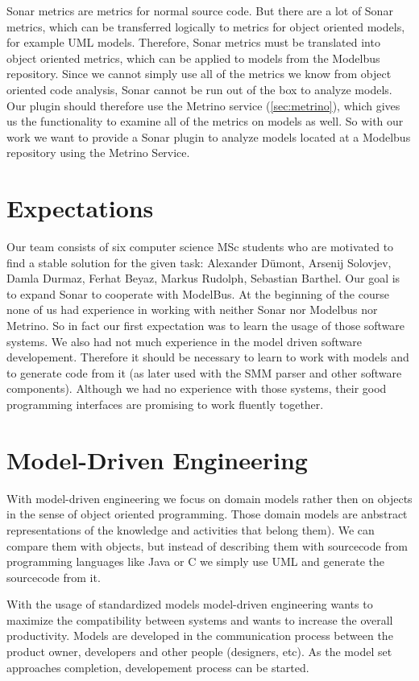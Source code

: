 Sonar metrics are metrics for normal source code. But there are a lot of Sonar metrics, which can be transferred logically to metrics for object oriented models, for example UML models. Therefore, Sonar metrics must be translated into object oriented metrics, which can be applied to models from the Modelbus repository. Since we cannot simply use all of the metrics we know from object oriented code analysis, Sonar cannot be run out of the box to analyze models. Our plugin should therefore use the Metrino service (\autoref{sec:metrino}), which gives us the functionality to examine all of the metrics on models as well. So with our work we want to provide a Sonar plugin to analyze models located at a Modelbus repository using the Metrino Service.

\section{Expectations}
Our team consists of six computer science MSc students who are motivated to find a stable solution for the given task: Alexander Dümont, Arsenij Solovjev, Damla Durmaz, Ferhat Beyaz, Markus Rudolph, Sebastian Barthel.
Our goal is to expand Sonar to cooperate with ModelBus. At the beginning of the course none of us had experience in working with neither Sonar nor Modelbus nor Metrino. So in fact our first expectation was to learn the usage of those software systems. We also had not much experience in the model driven software developement. Therefore it should be necessary to learn to work with models and to generate code from it (as later used with the SMM parser and other software components). Although we had no experience with those systems, their good programming interfaces are promising to work fluently together.

\section{Model-Driven Engineering}
With model-driven engineering we focus on domain models rather then on objects in the sense of object oriented programming. Those domain models are anbstract representations of the knowledge and activities that belong them). We can compare them with objects, but instead of describing them with sourcecode from programming languages like Java or C we simply use UML and generate the sourcecode from it.

With the usage of standardized models model-driven engineering wants to maximize the compatibility between systems and wants to increase the overall productivity. Models are developed in the communication process between the product owner, developers and other people (designers, etc). As the model set approaches completion, developement process can be started.

